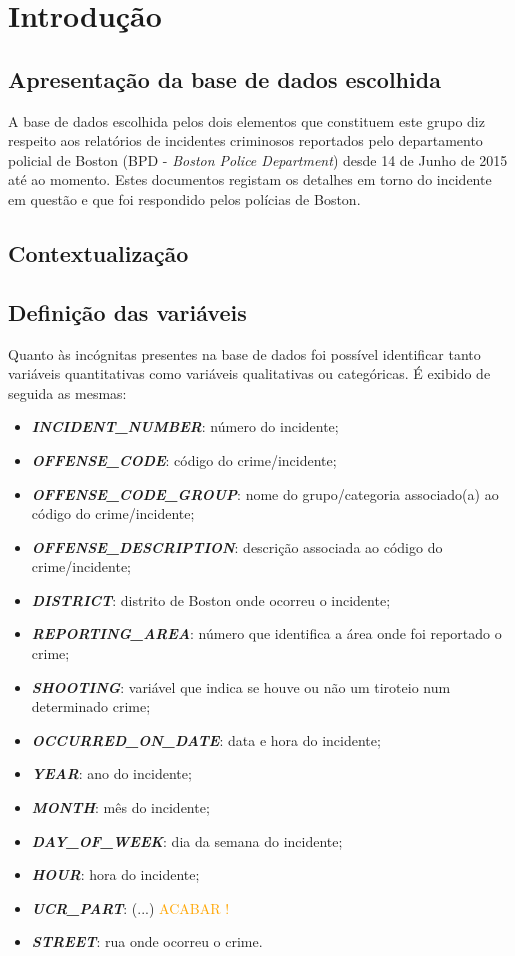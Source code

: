 \documentclass[a4paper]{report}
\begin{document}
\chapter{Introdução} \label{intro}
\large{
    \section{Apresentação da base de dados escolhida}
	A base de dados escolhida pelos dois elementos que constituem este grupo diz respeito aos relatórios de incidentes criminosos reportados pelo departamento policial de Boston (BPD - \textit{Boston Police Department}) desde 14 de Junho de 2015 até ao momento. Estes documentos registam os detalhes em torno do incidente em questão e que foi respondido pelos polícias de Boston.
	
	\section{Contextualização}
	
	
	\section{Definição das variáveis}
	Quanto às incógnitas presentes na base de dados foi possível identificar tanto variáveis quantitativas como variáveis qualitativas ou categóricas. É exibido de seguida as mesmas:
    \begin{itemize}
	    \item \textit{\textbf{INCIDENT\_NUMBER}}: número do incidente;
	    \item \textit{\textbf{OFFENSE\_CODE}}: código do crime/incidente;
	    \item \textit{\textbf{OFFENSE\_CODE\_GROUP}}: nome do grupo/categoria associado(a) ao código do crime/incidente;
	    \item \textit{\textbf{OFFENSE\_DESCRIPTION}}: descrição associada ao código do crime/incidente;
	    \item \textit{\textbf{DISTRICT}}: distrito de Boston onde ocorreu o incidente;
	    \item \textit{\textbf{REPORTING\_AREA}}: número que identifica a área onde foi reportado o crime;
	    \item \textit{\textbf{SHOOTING}}: variável que indica se houve ou não um tiroteio num determinado crime;
	    \item \textit{\textbf{OCCURRED\_ON\_DATE}}: data e hora do incidente;
	    \item \textit{\textbf{YEAR}}: ano do incidente;
	    \item \textit{\textbf{MONTH}}: mês do incidente;
	    \item \textit{\textbf{DAY\_OF\_WEEK}}: dia da semana do incidente;
	    \item \textit{\textbf{HOUR}}: hora do incidente;
	    \item \textit{\textbf{UCR\_PART}}: (...) \textcolor{orange}{ACABAR !}
	    \item \textit{\textbf{STREET}}: rua onde ocorreu o crime.
    \end{itemize}
	
}
\end{document}
